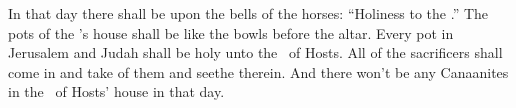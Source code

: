 \begin{inparaenum}
  \pa{} In that day there shall be  upon the bells of the horses: ``Holiness to the \lord.'' The pots of the \lord's house shall be like the bowls  before the altar.  Every pot in Jerusalem and Judah shall be holy unto the \lord\ of Hosts. All of the sacrificers shall come in and take of them and seethe therein. And there won't be any Canaanites in the \lord\ of Hosts' house in that day.%
\end{inparaenum}
